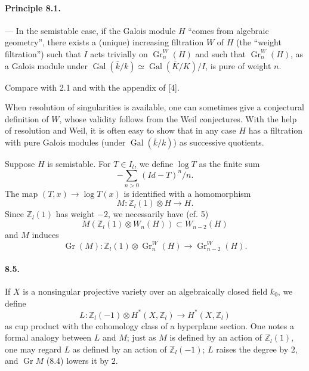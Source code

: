 \documentclass[10pt]{article}
\newcommand{\Z}{\mathbb Z}
\newcommand{\Gr}{\operatorname{Gr}}
\newcommand{\Gal}{\operatorname{Gal}}
\newcommand{\barK}{\overline{K}}
\begin{document}
\paragraph{Principle 8.1.} — In the semistable case, if the Galois module $H$ “comes from algebraic geometry”, there exists a (unique) increasing filtration $W$ of $H$ (the “weight filtration”) such that $I$ acts trivially on $\Gr_n^W(H)$ and such that $\Gr_n^W(H)$, as a Galois module under $\Gal(\bar k/k)\simeq\Gal(\barK/K)/I$, is pure of weight $n$.

Compare with 2.1 and with the appendix of [4].

When resolution of singularities is available, one can sometimes give a conjectural definition of $W$, whose validity follows from the Weil conjectures. With the help of resolution and Weil, it is often easy to show that in any case $H$ has a filtration with pure Galois modules (under $\Gal(\bar k/k)$) as successive quotients.

Suppose $H$ is semistable. For $T\in I_l$, we define $\log T$ as the finite sum
\[
-\sum_{n>0}(\mathit{Id}-T)^n/n.
\]
The map $(T,x)\to\log T(x)$ is identified with a homomorphism
\[
\tag{8.2}
M:\Z_l(1)\otimes H\longrightarrow H.
\]
Since $\Z_l(1)$ has weight $-2$, we necessarily have (cf. 5)
\[
\tag{8.3}
M(\Z_l(1)\otimes W_n(H))\subset W_{n-2}(H)
\]
and $M$ induces
\[
\tag{8.4}
\Gr(M):\Z_l(1)\otimes\Gr_n^W(H)\longrightarrow\Gr_{n-2}^W(H).
\]

\paragraph{8.5.} If $X$ is a nonsingular projective variety over an algebraically closed field $k_0$, we define
\[
L:\Z_l(-1)\otimes H^*(X,\Z_l)\longrightarrow H^*(X,\Z_l)
\]
as cup product with the cohomology class of a hyperplane section. One notes a formal analogy between $L$ and $M$; just as $M$ is defined by an action of $\Z_l(1)$, one may regard $L$ as defined by an action of $\Z_l(-1)$; $L$ raises the degree by $2$, and $\Gr M$ (8.4) lowers it by $2$.
\end{document}
